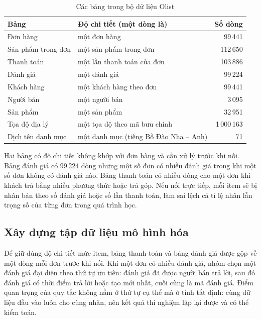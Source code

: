 \begin{table}[htbp]\centering\small
\caption{Các bảng trong bộ dữ liệu Olist}\label{tab:olist}
\begin{tabular}{llr}
\toprule
Bảng & Độ chi tiết (một dòng là) & Số dòng \\
\midrule
Đơn hàng                 & một đơn hàng                          &    99\,441 \\
Sản phẩm trong đơn       & một sản phẩm trong đơn                &   112\,650 \\
Thanh toán               & một lần thanh toán của đơn            &   103\,886 \\
Đánh giá                 & một đánh giá                          &    99\,224 \\
Khách hàng               & một khách hàng theo đơn               &    99\,441 \\
Người bán                & một người bán                         &     3\,095 \\
Sản phẩm                 & một sản phẩm                          &    32\,951 \\
Tọa độ địa lý            & một tọa độ theo mã bưu chính          & 1\,000\,163 \\
Dịch tên danh mục        & một danh mục (tiếng Bồ Đào Nha -- Anh) & 71 \\
\bottomrule
\end{tabular}
\end{table}

Hai bảng có độ chi tiết không khớp với đơn hàng và cần xử lý trước khi nối. Bảng đánh giá có 99\,224 dòng nhưng một số đơn có nhiều đánh giá trong khi một số đơn không có đánh giá nào. Bảng thanh toán có nhiều dòng cho một đơn khi khách trả bằng nhiều phương thức hoặc trả góp. Nếu nối trực tiếp, mỗi item sẽ bị nhân bản theo số đánh giá hoặc số lần thanh toán, làm sai lệch cả tỉ lệ nhãn lẫn trọng số của từng đơn trong quá trình học.

\subsection{Xây dựng tập dữ liệu mô hình hóa}

Để giữ đúng độ chi tiết mức item, bảng thanh toán và bảng đánh giá được gộp về một dòng mỗi đơn trước khi nối. Khi một đơn có nhiều đánh giá, nhóm chọn một đánh giá đại diện theo thứ tự ưu tiên: đánh giá đã được người bán trả lời, sau đó đánh giá có thời điểm trả lời hoặc tạo mới nhất, cuối cùng là mã đánh giá. Điểm quan trọng của quy tắc không nằm ở thứ tự cụ thể mà ở tính tất định: cùng dữ liệu đầu vào luôn cho cùng nhãn, nên kết quả thí nghiệm lặp lại được và có thể kiểm toán.

